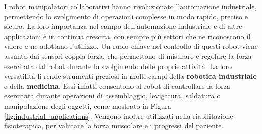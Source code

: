 I robot manipolatori collaborativi hanno rivoluzionato l'automazione industriale, permettendo lo svolgimento
di operazioni complesse in modo rapido, preciso e sicuro. 
La loro importanza nel campo dell'automazione industriale e di altre applicazioni \`{e} in continua crescita, con 
sempre pi\`{u} settori che ne riconoscono il valore e ne adottano l'utilizzo.
Un ruolo chiave nel controllo di questi robot viene assunto dai sensori coppia-forza,
che permettono di misurare e regolare la forza esercitata dal robot durante lo svolgimento delle proprie attivit\`{a}. 
La loro versatilit\`{a} li rende strumenti preziosi in molti campi della \textbf{robotica industriale} e della \textbf{medicina}. 
Essi infatti consentono al robot di controllare la forza esercitata durante operazioni di assemblaggio, levigatura, 
saldatura o manipolazione degli oggetti, come mostrato in Figura \ref{fig:industrial_applications}. 
Vengono inoltre utilizzati nella riabilitazione fisioterapica, per valutare la forza muscolare 
e i progressi del paziente. 
